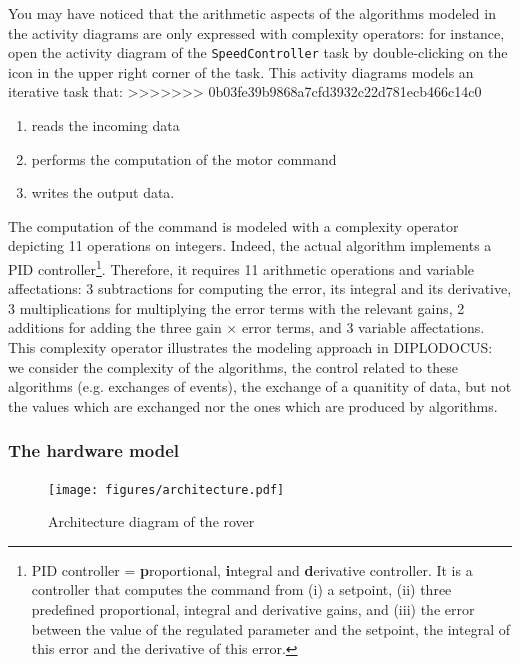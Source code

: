 \documentclass{article}
\begin{document}
You may have noticed that the arithmetic aspects of the algorithms modeled in the activity diagrams are only expressed with complexity operators: for instance, open the activity diagram of the \texttt{SpeedController} task by double-clicking on the icon in the upper right corner of the task. This activity diagrams models an iterative task that:
>>>>>>> 0b03fe39b9868a7cfd3932c22d781ecb466c14c0
\begin{enumerate}
	\item reads the incoming data
	\item performs the computation of the motor command
	\item writes the output data.
\end{enumerate}
The computation of the command is modeled with a complexity operator depicting 11 operations on integers. Indeed, the actual algorithm implements a PID controller\footnote{PID controller = \textbf{p}roportional, \textbf{i}ntegral and \textbf{d}erivative controller. It is a controller that computes the command from (i) a setpoint, (ii) three predefined proportional, integral and derivative gains, and (iii) the error between the value of the regulated parameter and the setpoint, the integral of this error and the derivative of this error.}. Therefore, it requires 11 arithmetic operations and variable affectations: 3 subtractions for computing the error, its integral and its derivative, 3 multiplications for multiplying the error terms with the relevant gains, 2 additions for adding the three gain $\times$ error terms, and 3 variable affectations. This complexity operator illustrates the modeling approach in DIPLODOCUS: we consider the complexity of the algorithms, the control related to these algorithms (e.g. exchanges of events), the exchange of a quanitity of data, but not the values which are exchanged nor the ones which are produced by algorithms.

\subsubsection{The hardware model}

\begin{figure}
	\hspace*{-1cm}
	\centering
	\texttt{[image: figures/architecture.pdf]}
	\caption{Architecture diagram of the rover}
	\label{fig:roverarchitecture}
\end{figure}
\end{document}
